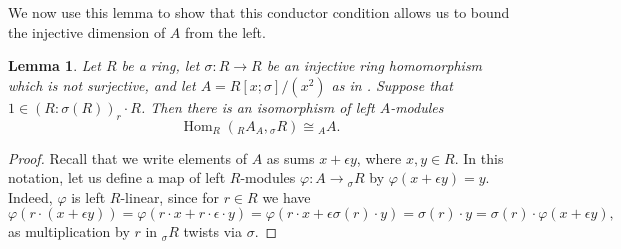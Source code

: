 \documentclass{amsart}
\newtheorem{lem}[equation]{Lemma}
\theoremstyle{definition}
\newcommand{\opn}{\operatorname}
\numberwithin{equation}{section}
\begin{document}
We now use this lemma to show that this conductor condition allows us to bound the injective dimension of $A$ from the left.

\begin{lem}\label{lem:homIsom}
Let $R$ be a ring, let $\sigma:R \to R$ be an injective ring homomorphism which is not surjective,
and let $A = R[x;\sigma]/(x^2)$ as in .
Suppose that 
$1 \in (R:\sigma(R))_r\cdot R$.
Then there is an isomorphism of left $A$-modules
\[
\opn{Hom}_R\left({}_R A_A, {}_{\sigma} R\right) \cong {}_A A.
\]
\end{lem}
\begin{proof}
Recall that we write elements of $A$ as sums $x+\epsilon y$,
where $x,y \in R$. 
In this notation, let us define a map of left $R$-modules $\varphi:A \to {}_\sigma R$ by $\varphi(x+\epsilon y) = y$.
Indeed, $\varphi$ is left $R$-linear,
since for $r \in R$ we have
\[
\varphi(r\cdot (x+\epsilon y)) = \varphi(r\cdot x + r \cdot \epsilon \cdot y) = \varphi(r\cdot x + \epsilon \sigma(r) \cdot y) = \sigma(r) \cdot y = \sigma(r) \cdot \varphi(x+\epsilon y),
\]
as multiplication by $r$ in ${}_\sigma R$ twists via $\sigma$.


\end{proof}
\end{document}
